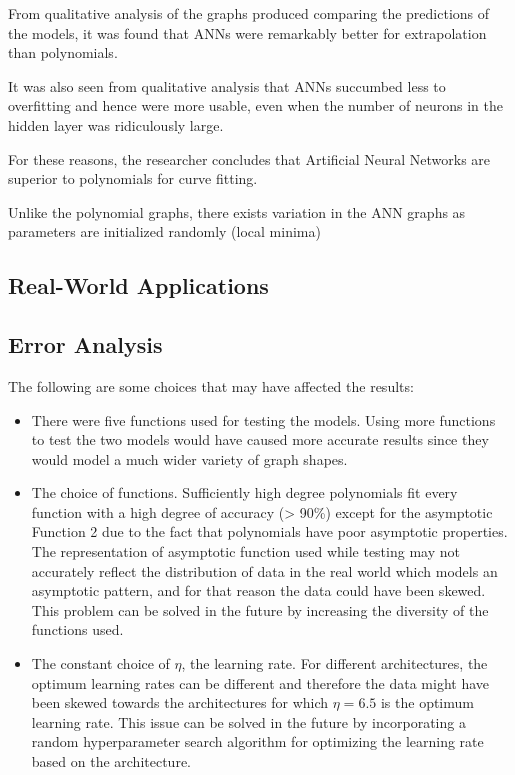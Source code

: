 \documentclass{article}
\begin{document}
From qualitative analysis of the graphs produced comparing the predictions of the models, it was found that ANNs were remarkably better for extrapolation than polynomials.

It was also seen from qualitative analysis that ANNs succumbed less to overfitting and hence were more usable, even when the number of neurons in the hidden layer was ridiculously large.

For these reasons, the researcher concludes that Artificial Neural Networks are superior to polynomials for curve fitting.


Unlike the polynomial graphs, there exists variation in the ANN graphs as parameters are initialized randomly (local minima)

\subsection{Real-World Applications}

\subsection{Error Analysis}

The following are some choices that may have affected the results:

\begin{itemize}
    \item There were five functions used for testing the models. Using more functions to test the two models would have caused more accurate results since they would model a much wider variety of graph shapes.
    \item The choice of functions. Sufficiently high degree polynomials fit every function with a high degree of accuracy (> 90\%) except for the asymptotic Function 2 due to the fact that polynomials have poor asymptotic properties. The representation of asymptotic function used while testing may not accurately reflect the distribution of data in the real world which models an asymptotic pattern, and for that reason the data could have been skewed. This problem can be solved in the future by increasing the diversity of the functions used.
    \item The constant choice of $\eta$, the learning rate. For different architectures, the optimum learning rates can be different and therefore the data might have been skewed towards the architectures for which $\eta=6.5$ is the optimum learning rate. This issue can be solved in the future by incorporating a random hyperparameter search algorithm for optimizing the learning rate based on the architecture.
\end{itemize}
\end{document}

